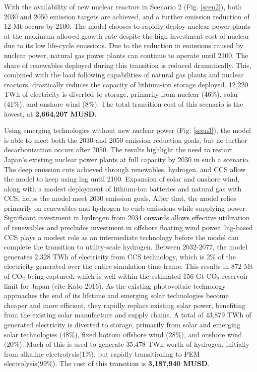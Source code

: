 With the availability of new nuclear reactors in Scenario 2 (Fig. \ref{scen2}), both 2030 and 2050 emission targets are achieved, and a further emission reduction of 12 Mt occurs by 2100. The model chooses to rapidly deploy nuclear power plants at the maximum allowed growth rate despite the high investment cost of nuclear due to its low life-cycle emissions. Due to the reduction in emissions caused by nuclear power, natural gas power plants can continue to operate until 2100. The share of renewables deployed during this transition is reduced dramatically. This, combined with the load following capabilities of natural gas plants and nuclear reactors, drastically reduces the capacity of lithium-ion storage deployed. 12,220 TWh of electricity is diverted to storage, primarily from nuclear (46\%), solar (41\%), and onshore wind (8\%). The total transition cost of this scenario is the lowest, at \textbf{2,664,207 MUSD.}

Using emerging technologies without new nuclear power (Fig. \ref{scen3}), the model is able to meet both the 2030 and 2050 emission reduction goals, but no further decarbonization occurs after 2050. The results highlight the need to restart Japan's existing nuclear power plants at full capacity by 2030 in such a scenario. The deep emission cuts achieved through renewables, hydrogen, and \gls{CCS} allow the model to keep using \gls{lng} until 2100. Expansion of solar and onshore wind, along with a modest deployment of lithium-ion batteries and natural gas with \gls{CCS}, helps the model meet 2030 emission goals. After that, the model relies primarily on renewables and hydrogen to curb emissions while supplying power. Significant investment in hydrogen from 2034 onwards allows effective utilization of renewables and precludes investment in offshore floating wind power. \gls{lng}-based \gls{CCS} plays a modest role as an intermediate technology before the model can complete the transition to utility-scale hydrogen. Between 2032-2077, the model generates 2,328 TWh  of electricity from \gls{CCS} technology, which is 2\% of the electricity generated over the entire simulation time-frame. This results in 872 Mt of CO$_2$ being captured, which is well within the estimated 156 Gt CO$_2$ reservoir limit for Japan (cite Kato 2016). As the existing photovoltaic technology approaches the end of its lifetime and emerging solar technologies become cheaper and more efficient, they rapidly replace existing solar power, benefiting from the existing solar manufacture and supply chains. A total of 43,879 TWh of generated electricity is diverted to storage, primarily from solar and emerging solar technologies (48\%), fixed bottom offshore wind (28\%), and onshore wind (20\%). Much of this is used to generate 35,478 TWh worth of hydrogen, initially from alkaline electrolysis(1\%), but rapidly transitioning to PEM electrolysis(99\%). The cost of this transition is \textbf{3,187,940 MUSD}.

